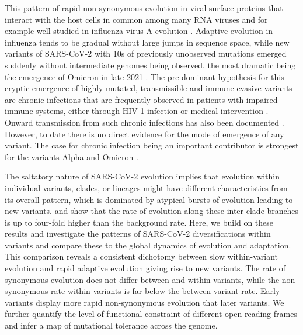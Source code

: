\documentclass[aps,rmp, twocolumn]{revtex4}
\begin{document}
This pattern of rapid non-synonymous evolution in viral surface proteins that interact with the host cells in common among many RNA viruses and for example well studied in influenza virus A evolution \citep{bhatt_genomic_2011,strelkowa_clonal_2012}.
Adaptive evolution in influenza tends to be gradual without large jumps in sequence space, while new variants of SARS-CoV-2 with 10s of previously unobserved mutations emerged suddenly without intermediate genomes being observed, the most dramatic being the emergence of Omicron in late 2021 \citep{viana_rapid_2022}.
The pre-dominant hypothesis for this cryptic emergence of highly mutated, transmissible and immune evasive variants are chronic infections that are frequently observed in patients with impaired immune systems, either through HIV-1 infection \citep{cele_sars-cov-2_2022} or medical intervention \citep{choi_persistence_2020,kemp_sars-cov-2_2021}.
Onward transmission from such chronic infections has also been documented \citep{gonzalez-reiche_intrahost_2022}.
However, to date there is no direct evidence for the mode of emergence of any variant.
The case for chronic infection being an important contributor is strongest for the variants Alpha and Omicron \citep{hill_origins_2022}.

The saltatory nature of SARS-CoV-2 evolution implies that evolution within individual variants, clades, or lineages might have different characteristics from its overall pattern, which is dominated by atypical bursts of evolution leading to new variants.
\citet{tay_emergence_2022} and \citet{hill_origins_2022} show that the rate of evolution along these inter-clade branches is up to four-fold higher than the background rate.
Here, we build on these results and investigate the patterns of SARS-CoV-2 diversifications within variants and compare these to the global dynamics of evolution and adaptation.
This comparison reveals a consistent dichotomy between slow within-variant evolution and rapid adaptive evolution giving rise to new variants.
The rate of synonymous evolution does not differ between and within variants, while the non-synonymous rate within variants is far below the between variant rate.
Early variants display more rapid non-synonymous evolution that later variants.
We further quantify the level of functional constraint of different open reading frames and infer a map of mutational tolerance across the genome.
\end{document}
